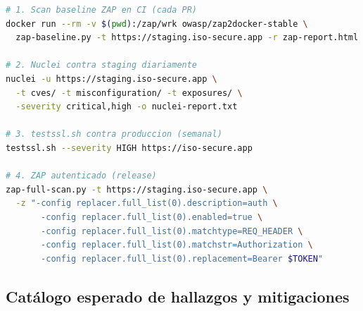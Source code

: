 \documentclass[12pt,a4paper,oneside]{article}
\begin{document}
\begin{lstlisting}[language=bash]
# 1. Scan baseline ZAP en CI (cada PR)
docker run --rm -v $(pwd):/zap/wrk owasp/zap2docker-stable \
  zap-baseline.py -t https://staging.iso-secure.app -r zap-report.html

# 2. Nuclei contra staging diariamente
nuclei -u https://staging.iso-secure.app \
  -t cves/ -t misconfiguration/ -t exposures/ \
  -severity critical,high -o nuclei-report.txt

# 3. testssl.sh contra produccion (semanal)
testssl.sh --severity HIGH https://iso-secure.app

# 4. ZAP autenticado (release)
zap-full-scan.py -t https://staging.iso-secure.app \
  -z "-config replacer.full_list(0).description=auth \
       -config replacer.full_list(0).enabled=true \
       -config replacer.full_list(0).matchtype=REQ_HEADER \
       -config replacer.full_list(0).matchstr=Authorization \
       -config replacer.full_list(0).replacement=Bearer $TOKEN"
\end{lstlisting}

\subsection{Catálogo esperado de hallazgos y mitigaciones}
\end{document}
